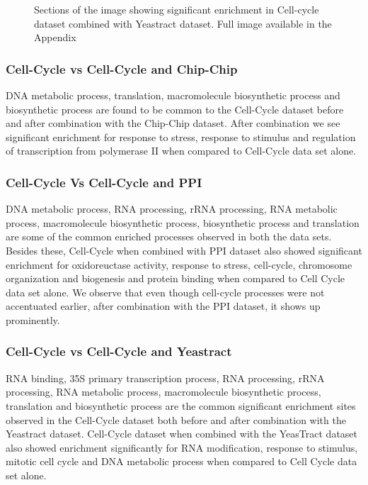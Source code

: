 \begin{figure}[p]
\centering
{}
\label{fig:ccycle_yt_enrich}
\caption[]{Sections of the image showing significant enrichment in Cell-cycle dataset combined with Yeastract dataset. Full image available in the Appendix}
\end{figure}

\subsubsection{Cell-Cycle vs Cell-Cycle and Chip-Chip}

DNA metabolic process, translation, macromolecule biosynthetic process and biosynthetic process are found to be common to the Cell-Cycle dataset before and after combination with the 
Chip-Chip dataset. After combination we see significant enrichment for response to stress, response to stimulus and regulation of transcription from polymerase II when compared 
to Cell-Cycle data set alone.

\subsubsection{Cell-Cycle Vs Cell-Cycle and PPI}

DNA metabolic process, RNA processing, rRNA processing, RNA metabolic process, macromolecule biosynthetic process, biosynthetic process and translation are 
some of the common enriched processes observed in both the data sets. Besides these, Cell-Cycle when combined with PPI dataset also showed significant enrichment for 
oxidoreuctase activity, response to stress, cell-cycle, chromosome organization and biogenesis and protein binding when compared to Cell Cycle data set alone. We observe that even though
cell-cycle processes were not accentuated earlier, after combination with the PPI dataset, it shows up prominently. 

\subsubsection{Cell-Cycle vs Cell-Cycle and Yeastract}

RNA binding, 35S primary transcription process, RNA processing, rRNA processing, RNA metabolic process, macromolecule biosynthetic process, 
translation and biosynthetic process are the common significant enrichment sites observed in the Cell-Cycle dataset both before and after combination with the Yeastract dataset. 
Cell-Cycle dataset when combined with the YeasTract dataset also showed enrichment significantly for RNA modification, response to stimulus, mitotic cell cycle 
and DNA metabolic process when compared to Cell Cycle data set alone. 

